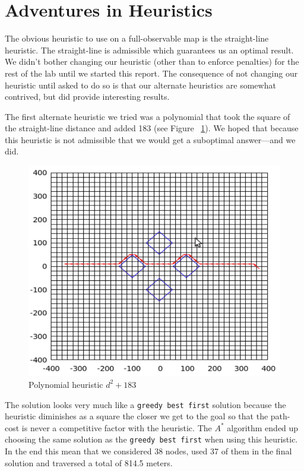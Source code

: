 \section{Adventures in Heuristics}
The obvious heuristic to use on a full-observable map is the straight-line heuristic.  The straight-line is admissible which guarantees us an optimal result.  We didn't bother changing our heuristic (other than to enforce penalties) for the rest of the lab until we started this report.  The consequence of not changing our heuristic until asked to do so is that our alternate heuristics are somewhat contrived, but did provide interesting results.
\par
The first alternate heuristic we tried was a polynomial that took the square of the straight-line distance and added 183 (see Figure ~\ref{fig:poly}).  We hoped that because this heuristic is not admissible that we would get a suboptimal answer---and we did.
\begin{figure}\label{fig:poly}
\begin{center}
\includegraphics[width=\textwidth]{heur1.png}
\caption{Polynomial heuristic $d^2 + 183$}
\end{center}
\end{figure}
The solution looks very much like a \texttt{greedy best first} solution because the heuristic diminishes as a square the closer we get to the goal so that the path-cost is never a competitive factor with the heuristic.  The $A^*$ algorithm ended up choosing the same solution as the \texttt{greedy best first} when using this heuristic.  In the end this mean that we considered 38 nodes, used 37 of them in the final solution and traversed a total of 814.5 meters.
